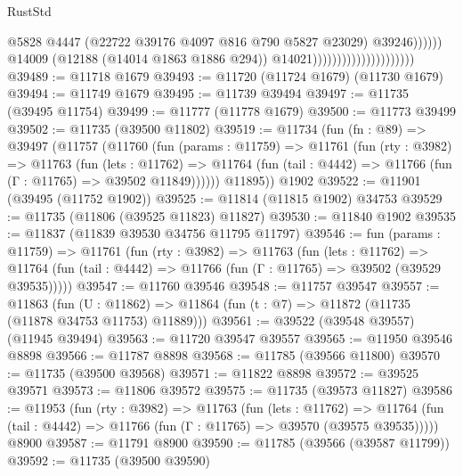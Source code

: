 \begin{lexlean}{RustStd}
\begin{coremodule}
                                                          @5828
                                                          @4447
                                                          (@22722
                                                            @39176
                                                            @4097
                                                            @816
                                                            @790
                                                            @5827
                                                            @23029)
                                                          @39246))))))
                                              @14009
                                              (@12188 (@14014 @1863 @1886 @294))
                                              @14021)))))))))))))))))))))
@39489 := @11718 @1679
@39493 := @11720 (@11724 @1679) (@11730 @1679)
@39494 := @11749 @1679
@39495 := @11739 @39494
@39497 := @11735 (@39495 @11754)
@39499 := @11777 (@11778 @1679)
@39500 := @11773 @39499
@39502 := @11735 (@39500 @11802)
@39519 := @11734
    (fun (fn : @89) =>
    @39497
      (@11757
        (@11760
          (fun (params : @11759) =>
          @11761
            (fun (rty : @3982) =>
            @11763
              (fun (lets : @11762) =>
              @11764 (fun (tail : @4442) => @11766 (fun (Γ : @11765) => @39502 @11849))))))
        @11895))
    @1902
@39522 := @11901 (@39495 (@11752 @1902))
@39525 := @11814 (@11815 @1902) @34753
@39529 := @11735 (@11806 (@39525 @11823) @11827)
@39530 := @11840 @1902
@39535 := @11837 (@11839 @39530 @34756 @11795 @11797)
@39546 := fun (params : @11759) =>
  @11761
    (fun (rty : @3982) =>
    @11763
      (fun (lets : @11762) =>
      @11764 (fun (tail : @4442) => @11766 (fun (Γ : @11765) => @39502 (@39529 @39535)))))
@39547 := @11760 @39546
@39548 := @11757 @39547
@39557 := @11863
    (fun (U : @11862) => @11864 (fun (t : @7) => @11872 (@11735 (@11878 @34753 @11753) @11889)))
@39561 := @39522 (@39548 @39557) (@11945 @39494)
@39563 := @11720 @39547 @39557
@39565 := @11950 @39546 @8898
@39566 := @11787 @8898
@39568 := @11785 (@39566 @11800)
@39570 := @11735 (@39500 @39568)
@39571 := @11822 @8898
@39572 := @39525 @39571
@39573 := @11806 @39572
@39575 := @11735 (@39573 @11827)
@39586 := @11953
    (fun (rty : @3982) =>
    @11763
      (fun (lets : @11762) =>
      @11764 (fun (tail : @4442) => @11766 (fun (Γ : @11765) => @39570 (@39575 @39535)))))
    @8900
@39587 := @11791 @8900
@39590 := @11785 (@39566 (@39587 @11799))
@39592 := @11735 (@39500 @39590)

\end{coremodule}
\end{lexlean}
